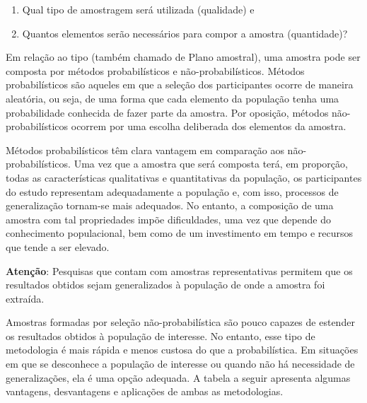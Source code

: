 \documentclass[
]{book}
\providecommand{\tightlist}{%
  \setlength{\itemsep}{0pt}\setlength{\parskip}{0pt}}
\begin{document}
\begin{enumerate}
\def\labelenumi{\arabic{enumi})}
\tightlist
\item
  Qual tipo de amostragem será utilizada (qualidade) e\\
\item
  Quantos elementos serão necessários para compor a amostra (quantidade)?
\end{enumerate}

Em relação ao tipo (também chamado de Plano amostral), uma amostra pode ser composta por métodos probabilísticos e não-probabilísticos. Métodos probabilísticos são aqueles em que a seleção dos participantes ocorre de maneira aleatória, ou seja, de uma forma que cada elemento da população tenha uma probabilidade conhecida de fazer parte da amostra. Por oposição, métodos não-probabilísticos ocorrem por uma escolha deliberada dos elementos da amostra.

Métodos probabilísticos têm clara vantagem em comparação aos não-probabilísticos. Uma vez que a amostra que será composta terá, em proporção, todas as características qualitativas e quantitativas da população, os participantes do estudo representam adequadamente a população e, com isso, processos de generalização tornam-se mais adequados. No entanto, a composição de uma amostra com tal propriedades impõe dificuldades, uma vez que depende do conhecimento populacional, bem como de um investimento em tempo e recursos que tende a ser elevado.

\textbf{Atenção}: Pesquisas que contam com amostras representativas permitem que os resultados obtidos sejam generalizados à população de onde a amostra foi extraída.

Amostras formadas por seleção não-probabilística são pouco capazes de estender os resultados obtidos à população de interesse. No entanto, esse tipo de metodologia é mais rápida e menos custosa do que a probabilística. Em situações em que se desconhece a população de interesse ou quando não há necessidade de generalizações, ela é uma opção adequada. A tabela a seguir apresenta algumas vantagens, desvantagens e aplicações de ambas as metodologias.
\end{document}
